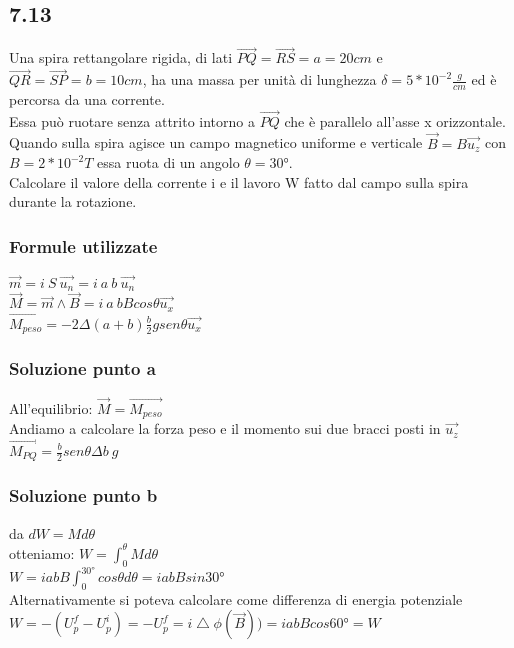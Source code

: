 \documentclass[../../main.tex]{subfiles}
\begin{document}
\subsection*{7.13}
Una spira rettangolare rigida, di lati $\vec{PQ} = \vec{RS} = a = 20cm$ e $\vec{QR} = \vec{SP} = b = 10cm$, ha una massa per unità di lunghezza $\delta = 5 * 10^{-2} \frac{g}{cm}$ ed è percorsa da una corrente.
\\Essa può ruotare senza attrito intorno a $\vec{PQ}$ che è parallelo all'asse x orizzontale. Quando sulla spira agisce un campo magnetico uniforme e verticale $\vec{B}=B\vec{u_z}$ con $B=2*10^{-2}T$ essa ruota di un angolo $\theta = 30°$.
\\Calcolare il valore della corrente i e il lavoro W fatto dal campo sulla spira durante la rotazione. 
\subsubsection*{Formule utilizzate}
$\vec{m} = i\ S\ \vec{u_n} = i\ a\ b\ \vec{u_n}$
\\$\vec{M} = \vec{m} \wedge  \vec{B} = i\ a\ bB cos\theta\vec{u_x}$
\\$\vec{M_{peso}} = -2\Delta(a+b)\frac{b}{2}gsen\theta\vec{u_x}$
\subsubsection*{Soluzione punto a}
All'equilibrio: $\vec{M} = \vec{M_{peso}}$
\\Andiamo a calcolare la forza peso e il momento sui due bracci posti in $\vec{u_z}$
\\$\vec{M_{PQ}} = \frac{b}{2}sen\theta\Delta b\ g$
\subsubsection*{Soluzione punto b}
da $dW = Md\theta$
\\otteniamo: $W = \int_0^\theta Md\theta$
\\$W = iabB\int_0^{30°}cos\theta d\theta = iabBsin30°$
\\Alternativamente si poteva calcolare come differenza di energia potenziale
\\$W = -(U_p^f - U_p^i) = -U_p^f = i\bigtriangleup \phi(\vec{B})) =iabBcos60° = W$
\newpage
\end{document}
